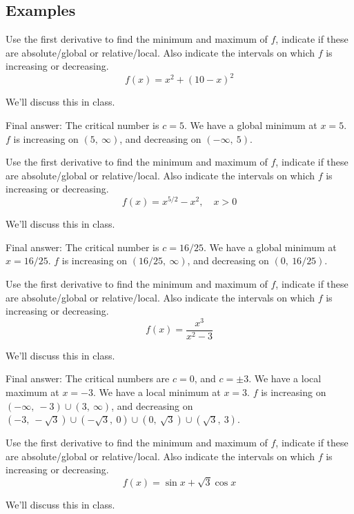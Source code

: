 \documentclass[12pt,addpoints, answers, fleqn]{exam}
\begin{document}
\subsection{Examples}
\begin{questions}

\question Use the first derivative to find the minimum and maximum of $f$, indicate if these are absolute/global or relative/local. Also indicate the intervals on which $f$ is increasing or decreasing.
\[
f\left(x \right) = x^2 + \left( 10 - x \right)^2
\]
\begin{solution}
We'll discuss this in class.

Final answer: The critical number is $c=5$. We have a global minimum at $x=5$. $f$ is increasing on $\left( 5, \ \infty \right)$, and decreasing on $\left( -\infty, \ 5 \right)$.
\end{solution}

\question Use the first derivative to find the minimum and maximum of $f$, indicate if these are absolute/global or relative/local. Also indicate the intervals on which $f$ is increasing or decreasing.
\[
f\left(x \right) = x^{5/2} - x^2, \quad x >0
\]
\begin{solution}
We'll discuss this in class.

Final answer: The critical number is $c=16/25$. We have a global minimum at $x=16/25$. $f$ is increasing on $\left( 16/25, \ \infty \right)$, and decreasing on $\left( 0, \ 16/25 \right)$.
\end{solution}



\question Use the first derivative to find the minimum and maximum of $f$, indicate if these are absolute/global or relative/local. Also indicate the intervals on which $f$ is increasing or decreasing.
\[
f\left(x \right) = \frac{x^3}{x^2-3}
\]
\begin{solution}
We'll discuss this in class.

Final answer: The critical numbers are $c=0$, and $c=\pm 3$. We have a local maximum at $x=-3$. We have a local minimum at $x=3$. $f$ is increasing on $\left( -\infty, \ -3 \right) \cup \left( 3, \ \infty \right)$, and decreasing on $\left( -3, \  -\sqrt{3} \right) \cup \left( -\sqrt{3}, \ 0 \right) \cup \left(0 , \ \sqrt{3} \right) \cup \left( \sqrt{3}, \ 3 \right)$.
\end{solution}



\question Use the first derivative to find the minimum and maximum of $f$, indicate if these are absolute/global or relative/local. Also indicate the intervals on which $f$ is increasing or decreasing.
\[
f\left(x \right) = \sin x + \sqrt{3} \cos x
\]
\begin{solution}
We'll discuss this in class.


\end{solution}
\end{questions}
\end{document}
